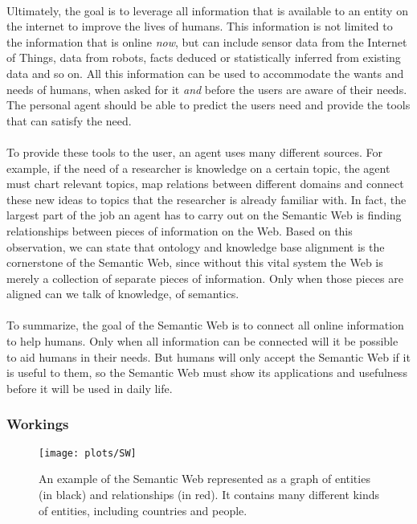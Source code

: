 \documentclass{article}
\begin{document}
 \paragraph{}
 Ultimately, the goal is to leverage all information that is available to an entity on the internet to improve the lives of humans. This information is not limited to the information that is online \emph{now}, but can include sensor data from the Internet of Things, data from robots, facts deduced or statistically inferred from existing data and so on. All this information can be used to accommodate the wants and needs of humans, when asked for it \textit{and} before the users are aware of their needs. The personal agent should be able to predict the users need and provide the tools that can satisfy the need.
 \paragraph{}
 To provide these tools to the user, an agent uses many different sources. For example, if the need of a researcher is knowledge on a certain topic, the agent must chart relevant topics, map relations between different domains and connect these new ideas to topics that the researcher is already familiar with. In fact, the largest part of the job an agent has to carry out on the Semantic Web is finding relationships between pieces of information on the Web. Based on this observation, we can state that ontology and knowledge base alignment is the cornerstone  of the Semantic Web, since without this vital system the Web is merely a collection of separate pieces of information. Only when those pieces are aligned can we talk of knowledge, of semantics.
 \paragraph{}
 To summarize, the goal of the Semantic Web is to connect all online information to help humans. Only when all information can be connected will it be possible to aid humans in their needs. But humans will only accept the Semantic Web if it is useful to them, so the Semantic Web must show its applications and usefulness before it will be used in daily life.
 \subsubsection{Workings}
 \begin{figure}[H]
 \centering
 \texttt{[image: plots/SW]}
 \caption[Semantic Web graph]{An example of the Semantic Web represented as a graph of entities (in black) and relationships (in red). It contains many different kinds of entities, including countries and people.}
 \label{semantic_web}
 \end{figure}
 
\end{document}
